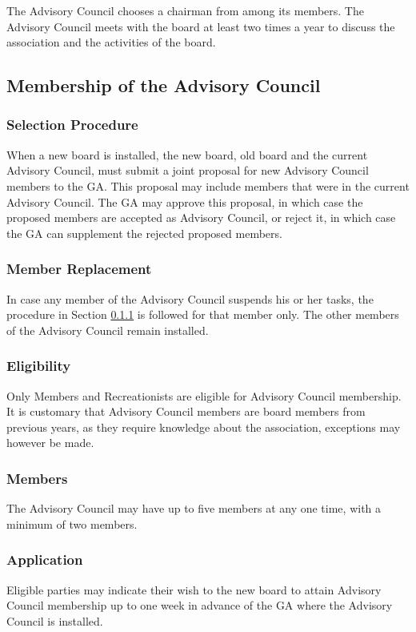 \documentclass[a4paper]{article}
\begin{document}
The Advisory Council chooses a chairman from among its members. The Advisory Council meets with the board at least two times a year to discuss the association and the activities of the board.

\subsection{Membership of the Advisory Council}
\subsubsection{Selection Procedure}
\label{sec:proc}
When a new board is installed, the new board, old board and the current Advisory Council, must submit a joint proposal for new Advisory Council members to the { GA}. This proposal may include members that were in the current Advisory Council. The { GA} may approve this proposal, in which case the proposed members are accepted as Advisory Council, or reject it, in which case the { GA} can supplement the rejected proposed members.

\subsubsection{Member Replacement}
In case any member of the Advisory Council suspends his or her tasks, the procedure in Section \ref{sec:proc} is followed for that member only. The other members of the Advisory Council remain installed.

\subsubsection{Eligibility}
Only { Members} and { Recreationists} are eligible for Advisory Council membership. It is customary that Advisory Council members are board members from previous years, as they require knowledge about the association, exceptions may however be made.

\subsubsection{Members}
The Advisory Council may have up to five members at any one time, with a minimum of two members.

\subsubsection{Application}
Eligible parties may indicate their wish to the new board to attain Advisory Council membership up to one week in advance of the { GA} where the Advisory Council is installed.
\end{document}
